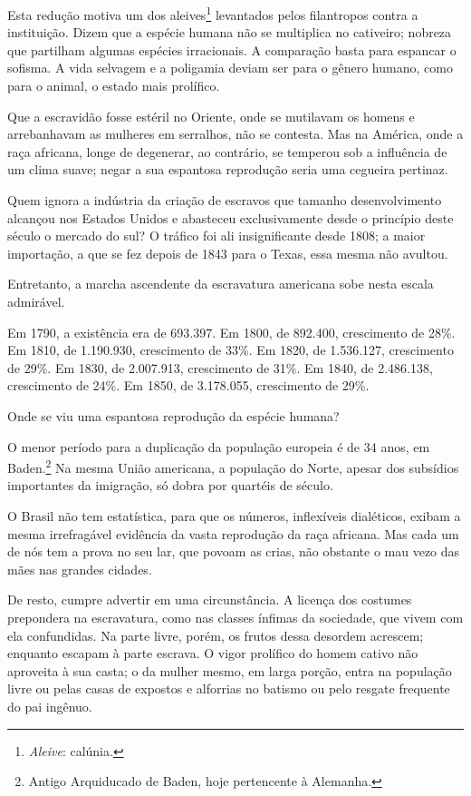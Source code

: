  Esta redução motiva um dos
aleives\footnote{ \textit{Aleive}: calúnia.}
 levantados pelos filantropos contra a instituição. Dizem que a espécie
humana não se multiplica no cativeiro; nobreza que partilham algumas
espécies irracionais. A comparação basta para espancar o sofisma. A
vida selvagem e a poligamia deviam ser para o gênero humano, como para
o animal, o estado mais prolífico.

 Que a escravidão fosse estéril no Oriente, onde se mutilavam os homens
e arrebanhavam as mulheres em serralhos, não se contesta. Mas na
América, onde a raça africana, longe de degenerar, ao contrário, se
temperou sob a influência de um clima suave; negar a sua espantosa
reprodução seria uma cegueira pertinaz. 

 Quem ignora a indústria da criação de escravos que tamanho
desenvolvimento alcançou nos Estados Unidos e abasteceu exclusivamente
desde o princípio deste século o mercado do sul? O tráfico foi ali
insignificante desde 1808; a maior importação, a que se fez depois de
1843 para o Texas, essa mesma não avultou. 

 Entretanto, a marcha ascendente da escravatura americana sobe nesta
escala admirável.

 Em 1790, a existência era de 693.397. Em 1800, de 892.400, crescimento
de 28\%. Em 1810, de 1.190.930, crescimento de 33\%. Em 1820, de
1.536.127, crescimento de 29\%. Em 1830, de 2.007.913, crescimento de
31\%. Em 1840, de 2.486.138, crescimento de 24\%. Em 1850, de
3.178.055, crescimento de 29\%. 

 Onde se viu uma espantosa reprodução da espécie humana?	\label{reproducao}

 O menor período para a duplicação da população europeia é de 34 anos,
em Baden.\footnote{ Antigo Arquiducado de Baden, hoje pertencente à Alemanha.}
 Na mesma União americana, a população do Norte, apesar dos subsídios
importantes da imigração, só dobra por quartéis de século.

 O Brasil não tem estatística, para que os números, inflexíveis
dialéticos, exibam a mesma irrefragável evidência da vasta reprodução
da raça africana. Mas cada um de nós tem a prova no seu lar, que povoam
as crias, não obstante o mau vezo das mães nas grandes cidades. 

 De resto, cumpre advertir em uma circunstância. A licença dos costumes
prepondera na escravatura, como nas classes ínfimas da sociedade, que
vivem com ela confundidas. Na parte livre, porém, os frutos dessa
desordem acrescem; enquanto escapam à parte escrava. O vigor prolífico
do homem cativo não aproveita à sua casta; o da mulher mesmo, em larga
porção, entra na população livre ou pelas casas de expostos e alforrias
no batismo ou pelo resgate frequente do pai ingênuo.

